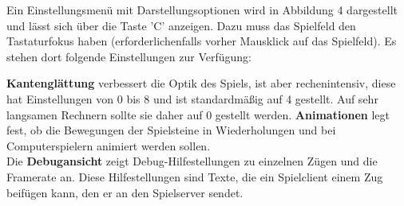 \documentclass[a4paper, ngerman]{scrartcl}
\begin{document}
	Ein Einstellungsmenü mit Darstellungsoptionen wird in Abbildung 4 dargestellt
	und lässt sich über die Taste 'C' anzeigen. Dazu muss das
Spielfeld den Tastaturfokus haben (erforderlichenfalls
vorher Mausklick auf das Spielfeld). Es stehen dort
folgende Einstellungen zur Verfügung: 

\textbf{Kantenglättung} verbessert die Optik des
Spiels, ist aber rechenintensiv, diese hat Einstellungen von 0 bis 8 und ist
standardmäßig auf 4 gestellt.
Auf sehr langsamen Rechnern sollte sie daher auf 0 gestellt werden.
\textbf{Animationen} legt fest, ob die Bewegungen der Spielsteine in
Wiederholungen und bei Computerspielern animiert werden sollen.\\
Die \textbf{Debugansicht} zeigt Debug-Hilfestellungen zu einzelnen Zügen und
die Framerate an.
Diese Hilfestellungen sind Texte, die ein Spielclient einem Zug beifügen kann, den er
an den Spielserver sendet.
	
\end{document}
